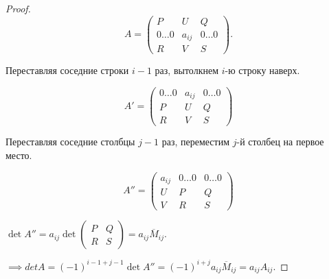 \begin{proof}
    \begin{equation*}
        A = \left(
            \begin{array}{c|c|c}
              P & U & Q \\
              \hline
              0 \dots 0 & a_{ij} & 0 \dots 0 \\
              \hline
              R & V & S
            \end{array}
        \right)
    .\end{equation*}

    Переставляя соседние строки $i - 1$ раз, вытолкнем $i$-ю строку наверх.

    \begin{equation*}
        A' = \left(
            \begin{array}{c|c|c}
                0 \dots 0 & a_{ij} & 0 \dots 0 \\
                \hline
                P & U & Q \\
                \hline
                R & V & S
            \end{array}
        \right)
    \end{equation*}

    Переставляя соседние столбцы $j - 1$ раз, переместим $j$-й столбец на первое место.

    \begin{equation*}
        A'' = \left(
            \begin{array}{c|c|c}
                a_{ij} & 0 \dots 0 & 0 \dots 0 \\
                \hline
                U & P & Q \\
                \hline
                V & R & S
            \end{array}
        \right)
    \end{equation*}

    $\det A'' = a_{ij} \det \left(
        \begin{array}{c|c}
            P & Q \\
            \hline
            R & S
        \end{array}
    \right) = a_{ij} \overline{M}_{ij}$.

    \bigskip
    $\implies det A = (-1)^{i - 1 + j - 1} \det A'' = (-1)^{i + j} a_{ij} \overline{M}_{ij} = a_{ij} A_{ij}$.
\end{proof}


